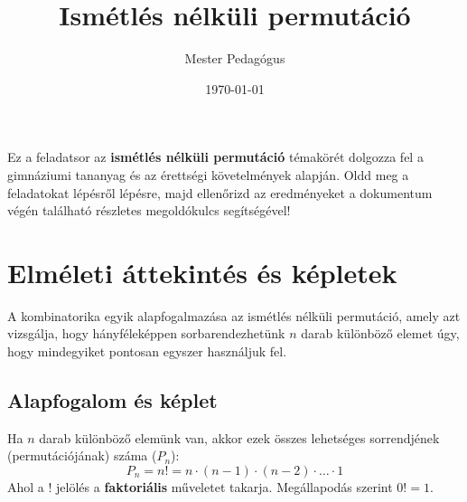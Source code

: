\documentclass[12pt,a4paper]{article}
\title{Ismétlés nélküli permutáció}
\author{Mester Pedagógus}
\date{\today}
\begin{document}
\maketitle

\begin{center}
    \begin{tcolorbox}[colback=blue!5!white,colframe=blue!75!black,width=0.9\textwidth,arc=4mm,title=\textbf{Üdvözlet a gyakorlóhoz!}]
    Ez a feladatsor az \textbf{ismétlés nélküli permutáció} témakörét dolgozza fel a gimnáziumi tananyag és az érettségi követelmények alapján. Oldd meg a feladatokat lépésről lépésre, majd ellenőrizd az eredményeket a dokumentum végén található részletes megoldókulcs segítségével!
    \end{tcolorbox}
\end{center}

\vspace{0.5cm}

\section{Elméleti áttekintés és képletek}

A kombinatorika egyik alapfogalmazása az ismétlés nélküli permutáció, amely azt vizsgálja, hogy hányféleképpen sorbarendezhetünk $n$ darab különböző elemet úgy, hogy mindegyiket pontosan egyszer használjuk fel.

\subsection{Alapfogalom és képlet}
Ha $n$ darab különböző elemünk van, akkor ezek összes lehetséges sorrendjének (permutációjának) száma ($P_n$):
\begin{equation}
    P_n = n! = n \cdot (n - 1) \cdot (n - 2) \cdot \ldots \cdot 1
\end{equation}
Ahol a $!$ jelölés a \textbf{faktoriális} műveletet takarja. Megállapodás szerint $0! = 1$.
\end{document}
